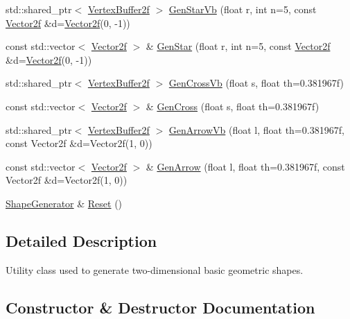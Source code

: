 \begin{DoxyCompactItemize}
\item 
std\+::shared\+\_\+ptr$<$ \hyperlink{group__gfx__group_ga081cf45a441eef100dfbb1e0f64c3826}{Vertex\+Buffer2f} $>$ \hyperlink{classastu_1_1suite2d_1_1ShapeGenerator_aeafd7037c8e24ab68a66dd2f778078b8}{Gen\+Star\+Vb} (float r, int n=5, const \hyperlink{classastu_1_1Vector2}{Vector2f} \&d=\hyperlink{classastu_1_1Vector2}{Vector2f}(0, -\/1))
\item 
const std\+::vector$<$ \hyperlink{classastu_1_1Vector2}{Vector2f} $>$ \& \hyperlink{classastu_1_1suite2d_1_1ShapeGenerator_a58c9369dfe59e735b8eba6b5ef994598}{Gen\+Star} (float r, int n=5, const \hyperlink{classastu_1_1Vector2}{Vector2f} \&d=\hyperlink{classastu_1_1Vector2}{Vector2f}(0, -\/1))
\item 
std\+::shared\+\_\+ptr$<$ \hyperlink{group__gfx__group_ga081cf45a441eef100dfbb1e0f64c3826}{Vertex\+Buffer2f} $>$ \hyperlink{classastu_1_1suite2d_1_1ShapeGenerator_ab390c2586ac298fd27a1095181427620}{Gen\+Cross\+Vb} (float s, float th=0.\+381967f)
\item 
const std\+::vector$<$ \hyperlink{classastu_1_1Vector2}{Vector2f} $>$ \& \hyperlink{classastu_1_1suite2d_1_1ShapeGenerator_a6307265bf97cd225a00ddfffd26cba5f}{Gen\+Cross} (float s, float th=0.\+381967f)
\item 
std\+::shared\+\_\+ptr$<$ \hyperlink{group__gfx__group_ga081cf45a441eef100dfbb1e0f64c3826}{Vertex\+Buffer2f} $>$ \hyperlink{classastu_1_1suite2d_1_1ShapeGenerator_a8ce8a804d10cdb10622f48c104f9da77}{Gen\+Arrow\+Vb} (float l, float th=0.\+381967f, const Vector2f \&d=\+Vector2f(1, 0))
\item 
const std\+::vector$<$ \hyperlink{classastu_1_1Vector2}{Vector2f} $>$ \& \hyperlink{classastu_1_1suite2d_1_1ShapeGenerator_a9b409aad15a54495aed52482e2292970}{Gen\+Arrow} (float l, float th=0.\+381967f, const Vector2f \&d=\+Vector2f(1, 0))
\item 
\hyperlink{classastu_1_1suite2d_1_1ShapeGenerator}{Shape\+Generator} \& \hyperlink{classastu_1_1suite2d_1_1ShapeGenerator_ac34af94d641b17d67e6fa08ead679d84}{Reset} ()
\end{DoxyCompactItemize}


\subsection{Detailed Description}
Utility class used to generate two-\/dimensional basic geometric shapes. 

\subsection{Constructor \& Destructor Documentation}
\mbox{\label{classastu_1_1suite2d_1_1ShapeGenerator_a56c9de00ce73e09b63a122fa34561490}} 
